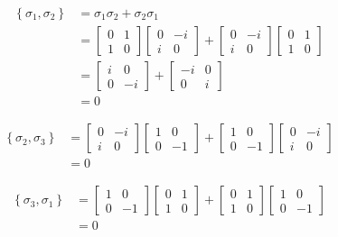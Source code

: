 \begin{align*}
\left\{\sigma_1, \sigma_2 \right\} &=\sigma_1 \sigma_2 + \sigma_2 \sigma_1\\
&= \begin{bmatrix}
0 & 1 \\
1 & 0
\end{bmatrix}
\begin{bmatrix}
0 & -i \\
i & 0
\end{bmatrix}
+
\begin{bmatrix}
0 & -i \\
i & 0
\end{bmatrix}
\begin{bmatrix}
0 & 1 \\
1 & 0
\end{bmatrix} \\
%
&=
%
\begin{bmatrix}
i & 0 \\
0 & -i
\end{bmatrix}
+
\begin{bmatrix}
-i & 0 \\
0 & i
\end{bmatrix}\\
%
&= 0
\end{align*}



\begin{align*}
\left\{\sigma_2, \sigma_3 \right\} &= \begin{bmatrix}
0 & -i \\
i & 0
\end{bmatrix}
\begin{bmatrix}
1 & 0 \\
0 & -1
\end{bmatrix}
+
\begin{bmatrix}
1 & 0 \\
0 & -1
\end{bmatrix}
\begin{bmatrix}
0 & -i \\
i & 0
\end{bmatrix}\\
&=0
\end{align*}



\begin{align*}
\left\{\sigma_3, \sigma_1 \right\} &= \begin{bmatrix}
1 & 0 \\
0 & -1
\end{bmatrix}
\begin{bmatrix}
0 & 1 \\
1 & 0
\end{bmatrix}
+
\begin{bmatrix}
0 & 1 \\
1 & 0
\end{bmatrix}
\begin{bmatrix}
1 & 0 \\
0 & -1
\end{bmatrix}\\
&=0
\end{align*}

